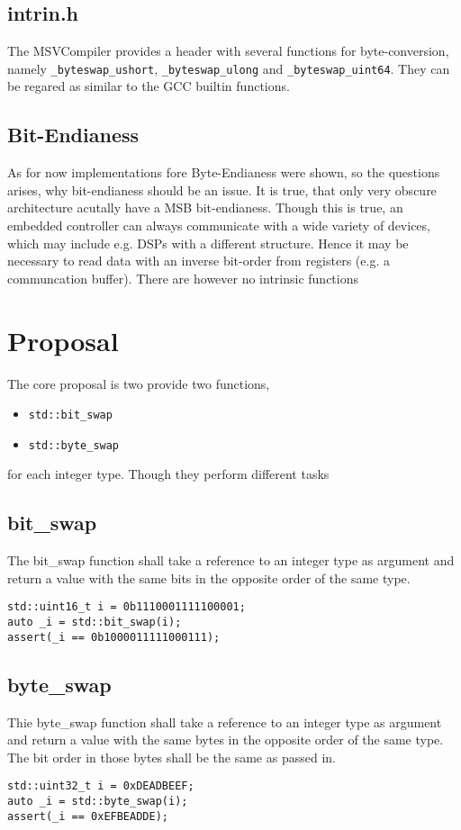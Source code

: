 \documentclass{article}
\begin{document}
\subsection{intrin.h}
The MSVCompiler provides a header with several functions for byte-conversion,
namely \lstinline {_byteswap_ushort}, \lstinline {_byteswap_ulong} and
\lstinline {_byteswap_uint64}. They can be regared as similar to the GCC builtin
functions.

\subsection{Bit-Endianess}
As for now implementations fore Byte-Endianess were shown, so the questions
arises, why bit-endianess should be an issue. It is true, that only very obscure
architecture acutally have a MSB bit-endianess. Though this is true,
an embedded controller can always communicate with a wide variety of devices, which
may include e.g. DSPs with a different structure. Hence it may be necessary to
read data with an inverse bit-order from registers (e.g. a communcation buffer).
There are however no intrinsic functions 

\section{Proposal}

The core proposal is two provide two functions,
\begin{itemize}
  \item \lstinline {std::bit_swap}
  \item \lstinline {std::byte_swap}
\end{itemize}
for each integer type. Though they perform different tasks 

\subsection{bit\_swap}
The bit\_swap function shall take a reference to an integer type as argument and
return a value with the same bits in the opposite order of the same type.
\begin{lstlisting}
std::uint16_t i = 0b1110001111100001;
auto _i = std::bit_swap(i);
assert(_i == 0b1000011111000111);
\end{lstlisting}
\subsection{byte\_swap}
Thie byte\_swap function shall take a reference to an integer type as argument and
return a value with the same bytes in the opposite order of the same type. The
bit order in those bytes shall be the same as passed in.
\begin{lstlisting}
std::uint32_t i = 0xDEADBEEF;
auto _i = std::byte_swap(i);
assert(_i == 0xEFBEADDE);
\end{lstlisting}
\end{document}
